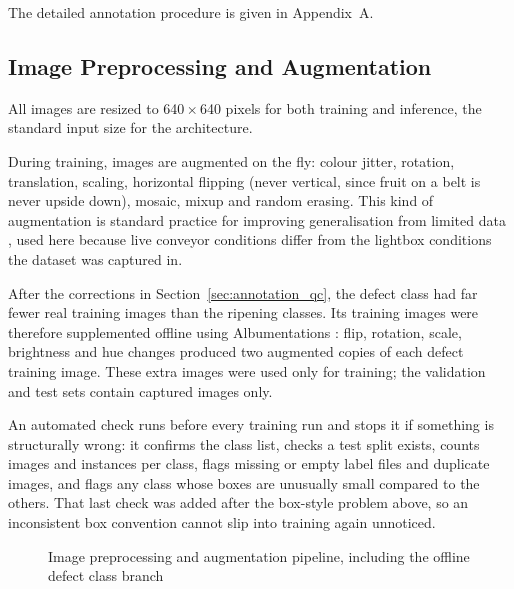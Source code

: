 
The detailed annotation procedure is given in Appendix~A.

\subsection{Image Preprocessing and Augmentation}
\label{sec:m_preprocessing}

All images are resized to 640\,$\times$\,640 pixels for both training and inference, the standard input size for the architecture.

During training, images are augmented on the fly: colour jitter, rotation, translation, scaling, horizontal flipping (never vertical, since fruit on a belt is never upside down), mosaic, mixup and random erasing. This kind of augmentation is standard practice for improving generalisation from limited data \citep{shorten2019}, used here because live conveyor conditions differ from the lightbox conditions the dataset was captured in.

After the corrections in Section~\ref{sec:annotation_qc}, the defect class had far fewer real training images than the ripening classes. Its training images were therefore supplemented offline using Albumentations \citep{buslaev2020}: flip, rotation, scale, brightness and hue changes produced two augmented copies of each defect training image. These extra images were used only for training; the validation and test sets contain captured images only.

An automated check runs before every training run and stops it if something is structurally wrong: it confirms the class list, checks a test split exists, counts images and instances per class, flags missing or empty label files and duplicate images, and flags any class whose boxes are unusually small compared to the others. That last check was added after the box-style problem above, so an inconsistent box convention cannot slip into training again unnoticed.


\begin{figure}[H]
\centering
{}
\caption{Image preprocessing and augmentation pipeline, including the offline defect class branch}
\label{fig:preprocessing}
\end{figure}

